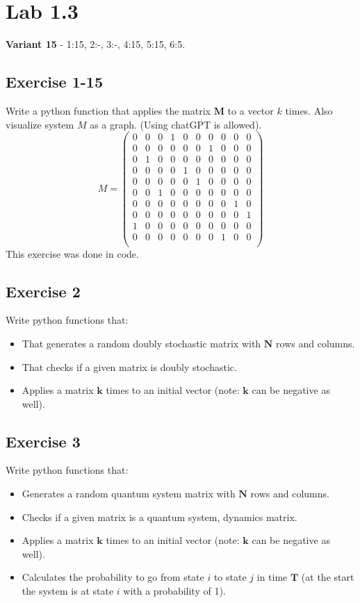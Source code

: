 \documentclass{article}
\begin{document}
    \section*{Lab 1.3}
        \textbf{Variant 15} - 1:15, 2:-, 3:-, 4:15, 5:15, 6:5.
        \subsection*{Exercise 1-15}
            Write a python function that applies the matrix $\mathbf{M}$ to a vector $k$ times. Also visualize system $M$ as a graph. (Using chatGPT is allowed).
            \[
                M=
                \begin{pmatrix}
                0&0&0&1&0&0&0&0&0&0\\0&0&0&0&0&0&1&0&0&0\\0&1&0&0&0&0&0&0&0&0\\0&0&0&0&1&0&0&0&0&0\\0&0&0&0&0&1&0&0&0&0\\0&0&1&0&0&0&0&0&0&0\\0&0&0&0&0&0&0&0&1&0\\0&0&0&0&0&0&0&0&0&1\\1&0&0&0&0&0&0&0&0&0\\0&0&0&0&0&0&0&1&0&0\\
                \end{pmatrix}
            \]
            This exercise was done in code.
        \subsection*{Exercise 2}
        Write python functions that:
        \begin{itemize}
            \item That generates a random doubly stochastic matrix with $\mathbf{N}$ rows and columns.
            \item That checks if a given matrix is doubly stochastic.
            \item Applies a matrix $\mathbf{k}$ times to an initial vector (note: $\mathbf{k}$ can be negative as well).
        \end{itemize}
        \subsection*{Exercise 3}
        Write python functions that:
        \begin{itemize}
            \item Generates a random quantum system matrix with $\mathbf{N}$ rows and columns.
            \item Checks if a given matrix is a quantum system, dynamics matrix.
            \item Applies a matrix $\mathbf{k}$ times to an initial vector (note: $\mathbf{k}$ can be negative as well).
            \item Calculates the probability to go from state $i$ to state $j$ in time $\mathbf{T}$ (at the start the system is at state $i$ with a probability of 1).
        \end{itemize}
\end{document}
